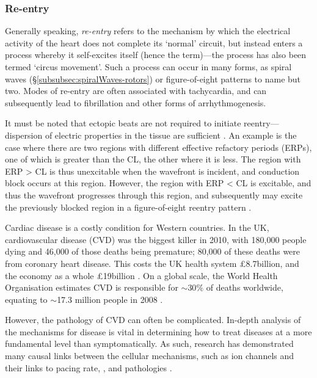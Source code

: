 \documentclass[../thesis-main.tex]{subfiles}
\begin{document}
\subsubsection{Re-entry}
\label{subsubsec:reentry}
Generally speaking, \emph{re-entry} refers to the mechanism by which the electrical activity of the heart does not complete its `normal' circuit, but instead enters a process whereby it self-excites itself (hence the term)---the process has also been termed `circus movement'. Such a process can occur in many forms, as spiral waves (\S\ref{subsubsec:spiralWaves-rotors}) or figure-of-eight patterns \citep{Ferrero2003} to name but two. Modes of re-entry are often associated with tachycardia, and can subsequently lead to fibrillation and other forms of arrhythmogenesis.

It must be noted that ectopic beats are not required to initiate reentry---dispersion of electric properties in the tissue are sufficient \citep{Xie2007}. An example is the case where there are two regions with different effective refactory periods (ERPs), one of which is greater than the CL, the other where it is less. The region with ERP > CL is thus unexcitable when the wavefront is incident, and conduction block occurs at this region. However, the region with ERP < CL is excitable, and thus the wavefront progresses through this region, and subsequently may excite the previously blocked region in a figure-of-eight reentry pattern \citep{Weiss2006}.

Cardiac disease is a costly condition for Western countries. In the UK, cardiovascular disease (CVD) was the biggest killer in 2010, with 180,000 people dying and 46,000 of those deaths being premature; 80,000 of these deaths were from coronary heart disease. This costs the UK health system \pounds8.7billion, and the economy as a whole \pounds19billion \citep{Townsend2012}. On a global scale, the World Health Organisation estimates CVD is responsible for $\sim$30$\%$ of deaths worldwide, equating to $\sim$17.3 million people in 2008 \citep{WHO2010}.

However, the pathology of CVD can often be complicated. In-depth analysis of the mechanisms for disease is vital in determining how to treat diseases at a more fundamental level than symptomatically. As such, research has demonstrated many causal links between the cellular mechanisms, such as ion channels and their links to pacing rate, \etc{}, and pathologies \citep{Inoue2006a, Kurz1993, Rodriguez2006, Dumaine1996, Nattel2010, Jurkat-Rott2005, Biagetti2006}.
\end{document}
